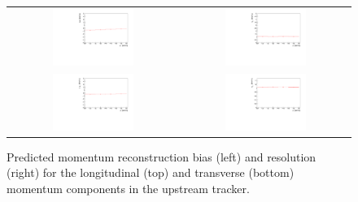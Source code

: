 \begin{figure}[ht]
	\centering
    \begin{tabular}{cc}
	    \includegraphics[width=0.5\textwidth]{upstream_p_bias_p.pdf} &	
        \includegraphics[width=0.5\textwidth]{upstream_p_resolution_p.pdf} \\
        \includegraphics[width=0.5\textwidth]{upstream_pt_bias_p.pdf} &
        \includegraphics[width=0.5\textwidth]{upstream_pt_resolution_p.pdf}
    \end{tabular}
	\caption{\label{trackers:performance:resolutions:up}Predicted momentum reconstruction bias (left) and resolution (right) for the longitudinal (top) and transverse (bottom) momentum components in the upstream tracker.}
\end{figure}

